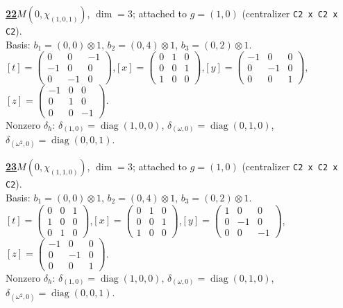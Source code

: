 \begin{samepage}\noindent\textbf{\underline{22}}\quad $M(0,\chi_{(1,0,1)})$, $\dim=3$; attached to $g=(1,0)$ (centralizer \texttt{C2 x C2 x C2}).\\
Basis: $b_{1}=(0,0)\otimes 1$, $b_{2}=(0,4)\otimes 1$, $b_{3}=(0,2)\otimes 1$.\\
$[t]=\left(\begin{smallmatrix} 0 & 0 & -1 \\ -1 & 0 & 0 \\ 0 & -1 & 0 \end{smallmatrix}\right)$,\quad $[x]=\left(\begin{smallmatrix} 0 & 1 & 0 \\ 0 & 0 & 1 \\ 1 & 0 & 0 \end{smallmatrix}\right)$,\quad $[y]=\left(\begin{smallmatrix} -1 & 0 & 0 \\ 0 & -1 & 0 \\ 0 & 0 & 1 \end{smallmatrix}\right)$,\quad $[z]=\left(\begin{smallmatrix} -1 & 0 & 0 \\ 0 & 1 & 0 \\ 0 & 0 & -1 \end{smallmatrix}\right)$.\\
Nonzero $\delta_h$: $\delta_{(1,0)}=\operatorname{diag}(1,0,0)$, $\delta_{(\omega,0)}=\operatorname{diag}(0,1,0)$, $\delta_{(\omega^2,0)}=\operatorname{diag}(0,0,1)$.\end{samepage}
\medskip

\begin{samepage}\noindent\textbf{\underline{23}}\quad $M(0,\chi_{(1,1,0)})$, $\dim=3$; attached to $g=(1,0)$ (centralizer \texttt{C2 x C2 x C2}).\\
Basis: $b_{1}=(0,0)\otimes 1$, $b_{2}=(0,4)\otimes 1$, $b_{3}=(0,2)\otimes 1$.\\
$[t]=\left(\begin{smallmatrix} 0 & 0 & 1 \\ 1 & 0 & 0 \\ 0 & 1 & 0 \end{smallmatrix}\right)$,\quad $[x]=\left(\begin{smallmatrix} 0 & 1 & 0 \\ 0 & 0 & 1 \\ 1 & 0 & 0 \end{smallmatrix}\right)$,\quad $[y]=\left(\begin{smallmatrix} 1 & 0 & 0 \\ 0 & -1 & 0 \\ 0 & 0 & -1 \end{smallmatrix}\right)$,\quad $[z]=\left(\begin{smallmatrix} -1 & 0 & 0 \\ 0 & -1 & 0 \\ 0 & 0 & 1 \end{smallmatrix}\right)$.\\
Nonzero $\delta_h$: $\delta_{(1,0)}=\operatorname{diag}(1,0,0)$, $\delta_{(\omega,0)}=\operatorname{diag}(0,1,0)$, $\delta_{(\omega^2,0)}=\operatorname{diag}(0,0,1)$.\end{samepage}
\medskip

